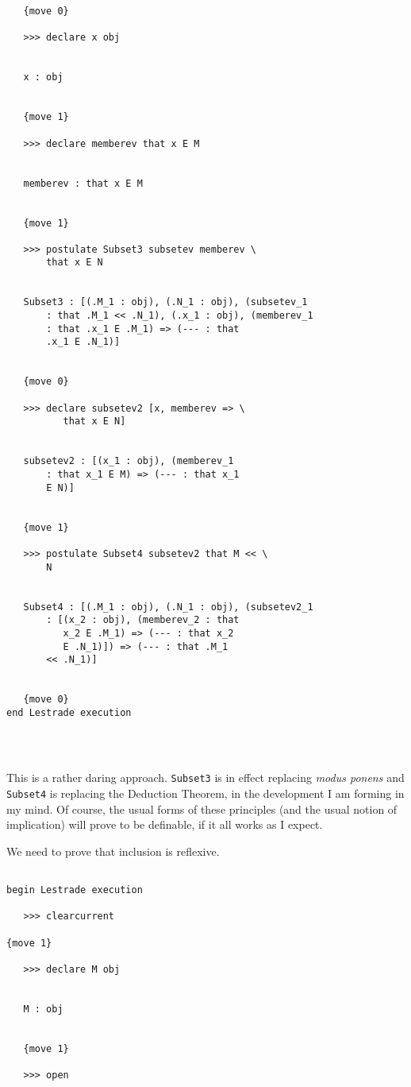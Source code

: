 \documentclass[12pt]{article}
\begin{document}
\begin{enumerate}
\begin{verbatim}
   {move 0}

   >>> declare x obj


   x : obj


   {move 1}

   >>> declare memberev that x E M


   memberev : that x E M


   {move 1}

   >>> postulate Subset3 subsetev memberev \
       that x E N


   Subset3 : [(.M_1 : obj), (.N_1 : obj), (subsetev_1 
       : that .M_1 << .N_1), (.x_1 : obj), (memberev_1 
       : that .x_1 E .M_1) => (--- : that 
       .x_1 E .N_1)]


   {move 0}

   >>> declare subsetev2 [x, memberev => \
          that x E N]


   subsetev2 : [(x_1 : obj), (memberev_1 
       : that x_1 E M) => (--- : that x_1 
       E N)]


   {move 1}

   >>> postulate Subset4 subsetev2 that M << \
       N


   Subset4 : [(.M_1 : obj), (.N_1 : obj), (subsetev2_1 
       : [(x_2 : obj), (memberev_2 : that 
          x_2 E .M_1) => (--- : that x_2 
          E .N_1)]) => (--- : that .M_1 
       << .N_1)]


   {move 0}
end Lestrade execution




\end{verbatim}

This is a rather daring approach.  {\tt Subset3} is in effect replacing {\em modus ponens\/} and {\tt Subset4} is replacing the Deduction Theorem, in the development I am forming in my mind.
Of course, the usual forms of these principles (and the usual notion of implication) will prove to be definable, if it all works as I expect.

We need to prove that inclusion is reflexive.

\begin{verbatim}

begin Lestrade execution

   >>> clearcurrent

{move 1}

   >>> declare M obj


   M : obj


   {move 1}

   >>> open



\end{verbatim}
\end{enumerate}
\end{document}
